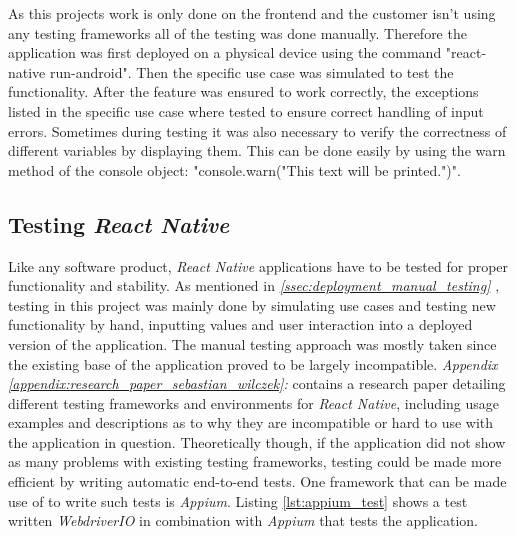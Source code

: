 As this projects work is only done on the frontend and the customer isn't using any testing frameworks all of the testing was done manually. Therefore the application was first deployed on a physical device using the command "react-native run-android". Then the specific use case was simulated to test the functionality. After the feature was ensured to work correctly, the exceptions listed in the specific use case where tested to ensure correct handling of input errors.
\newline
Sometimes during testing it was also necessary to verify the correctness of different variables by displaying them. This can be done easily by using the warn method of the console object: "console.warn("This text will be printed.")".

\subsection{Testing \textit{React Native}}
\label{ssec:testing_react_native}

Like any software product, \textit{React Native} applications have to be tested for proper functionality and stability. As mentioned in \textit{\ref{ssec:deployment_manual_testing} }, testing in this project was mainly done by simulating use cases and testing new functionality by hand, inputting values and user interaction into a deployed version of the application.
\newline
The manual testing approach was mostly taken since the existing base of the application proved to be largely incompatible. \textit{Appendix \ref{appendix:research_paper_sebastian_wilczek}: } contains a research paper detailing different testing frameworks and environments for \textit{React Native}, including usage examples and descriptions as to why they are incompatible or hard to use with the application in question.
\newline
Theoretically though, if the application did not show as many problems with existing testing frameworks, testing could be made more efficient by writing automatic end-to-end tests. One framework that can be made use of to write such tests is \textit{Appium}. Listing \ref{lst:appium_test} shows a test written \textit{WebdriverIO} in combination with \textit{Appium} that tests the application.

